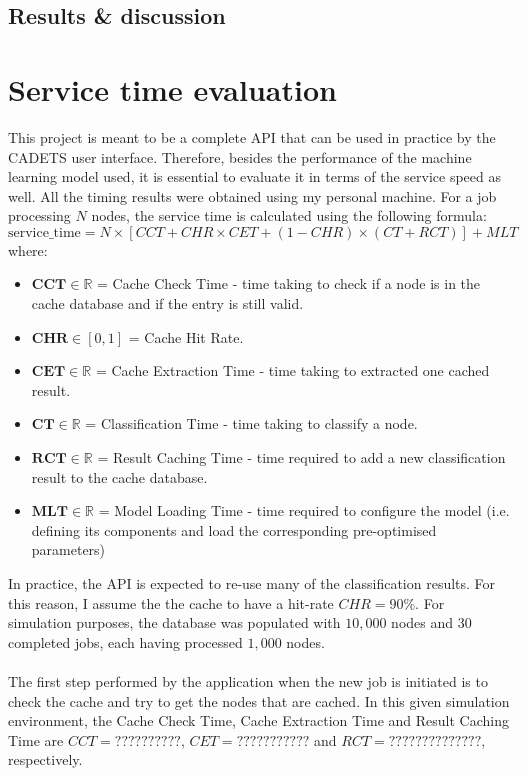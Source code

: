 		\subsection{Results \& discussion} \label{Section: eval/ml/results}

		\section{Service time evaluation} \label{Section: eval/service-time}
			This project is meant to be a complete API that can be used in practice by the CADETS user interface. Therefore, besides the performance of the machine learning model used, it is essential to evaluate it in terms of the service speed as well. All the timing results were obtained using my personal machine. For a job processing $N$ nodes, the service time is calculated using the following formula:  
			\begin{equation}
				\text{service\_time} = N\times [CCT + CHR \times CET + (1-CHR) \times (CT + RCT)] + MLT
				\label{Eq: eval/service-time/overall}
			\end{equation}
			where: 
			\begin{itemize}
				\item $\mathbf{CCT} \in \mathbb{R}$ = Cache Check Time - time taking to check if a node is in the cache database and if the entry is still valid.
				\item $\mathbf{CHR} \in [0, 1]$ = Cache Hit Rate.
				\item $\textbf{CET} \in \mathbb{R}$ = Cache Extraction Time - time taking to extracted one cached result.
				\item $\textbf{CT} \in \mathbb{R}$ = Classification Time - time taking to classify a node. 
				\item $\textbf{RCT} \in \mathbb{R}$ = Result Caching Time - time required to add a new classification result to the cache database.
				\item $\mathbf{MLT} \in \mathbb{R}$ = Model Loading Time - time required to configure the model (i.e. defining its components and load the corresponding pre-optimised parameters)
			\end{itemize}
			In practice, the API is expected to re-use many of the classification results. For this reason, I assume the the cache to have a hit-rate $CHR = 90\%$. For simulation purposes, the database was populated with $10, 000$ nodes and $30$ completed jobs, each having processed $1, 000$ nodes. 
			\\ \\
			The first step performed by the application when the new job is initiated is to check the cache and try to get the nodes that are cached. In this given simulation environment, the Cache Check Time, Cache Extraction Time and Result Caching Time are $CCT=??????????$, $CET=???????????$ and $RCT=??????????????$, respectively.  
			
